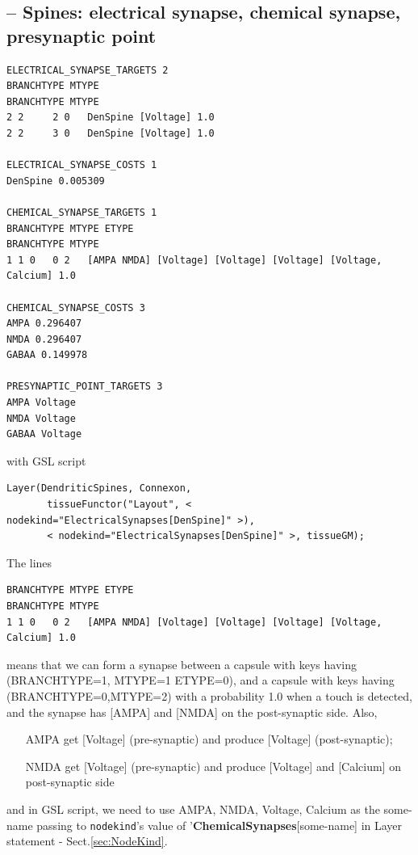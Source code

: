 \subsection{-- Spines: electrical synapse, chemical synapse, presynaptic point}
\label{sec:DendriticSpines}

{\small
\begin{verbatim}
ELECTRICAL_SYNAPSE_TARGETS 2
BRANCHTYPE MTYPE
BRANCHTYPE MTYPE 
2 2     2 0   DenSpine [Voltage] 1.0
2 2     3 0   DenSpine [Voltage] 1.0

ELECTRICAL_SYNAPSE_COSTS 1
DenSpine 0.005309

CHEMICAL_SYNAPSE_TARGETS 1
BRANCHTYPE MTYPE ETYPE
BRANCHTYPE MTYPE
1 1 0   0 2   [AMPA NMDA] [Voltage] [Voltage] [Voltage] [Voltage, Calcium] 1.0

CHEMICAL_SYNAPSE_COSTS 3
AMPA 0.296407
NMDA 0.296407
GABAA 0.149978

PRESYNAPTIC_POINT_TARGETS 3
AMPA Voltage
NMDA Voltage
GABAA Voltage
\end{verbatim}
}
with GSL script
{\small
\begin{verbatim}
Layer(DendriticSpines, Connexon, 
       tissueFunctor("Layout", < nodekind="ElectricalSynapses[DenSpine]" >), 
       < nodekind="ElectricalSynapses[DenSpine]" >, tissueGM);
\end{verbatim}
}

The lines
{\small
\begin{verbatim}
BRANCHTYPE MTYPE ETYPE
BRANCHTYPE MTYPE
1 1 0   0 2   [AMPA NMDA] [Voltage] [Voltage] [Voltage] [Voltage, Calcium] 1.0
\end{verbatim}
}
means that we can form a synapse between a capsule with keys having
(BRANCHTYPE=1, MTYPE=1 ETYPE=0), and a capsule with keys
having (BRANCHTYPE=0,MTYPE=2) with a probability 1.0 when a touch is detected,
and the synapse has [AMPA] and [NMDA] on the post-synaptic side. Also, 
\begin{itemize}
  \item  [AMPA] get [Voltage] (pre-synaptic) and produce [Voltage] (post-synaptic);
  
  \item [NMDA] get [Voltage] (pre-synaptic) and produce [Voltage] and [Calcium]
  on post-synaptic side
\end{itemize}
and in GSL script, we need to use AMPA, NMDA, Voltage, Calcium as the some-name
passing to \verb!nodekind!'s value of '{\bf ChemicalSynapses}[some-name] in
Layer statement - Sect.\ref{sec:NodeKind}.

